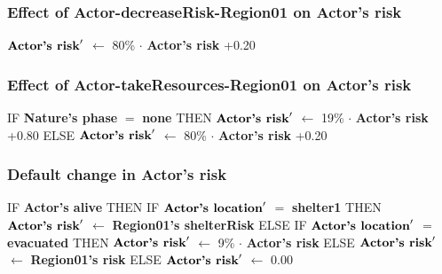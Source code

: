 \documentclass{article}%
\begin{document}
\subsubsection{Effect of Actor{-}decreaseRisk{-}Region01 on Actor's risk}%
\label{ssubsec:Effect of Actor{-}decreaseRisk{-}Region01 on Actor's risk}%
\begin{flushleft}%
$\mbox{\textbf{Actor's risk}} '$%
$\leftarrow$%
80\%%
$\cdot$%
\textbf{Actor's risk}%
+0.20%
\end{flushleft}

%
\subsubsection{Effect of Actor{-}takeResources{-}Region01 on Actor's risk}%
\label{ssubsec:Effect of Actor{-}takeResources{-}Region01 on Actor's risk}%
\begin{flushleft}%
IF %
\textbf{Nature's phase}%
$=$%
\textbf{none}%
\linebreak%
\hspace*{2em}%
THEN %
$\mbox{\textbf{Actor's risk}} '$%
$\leftarrow$%
19\%%
$\cdot$%
\textbf{Actor's risk}%
+0.80%
\linebreak%
\hspace*{2em}%
ELSE %
$\mbox{\textbf{Actor's risk}} '$%
$\leftarrow$%
80\%%
$\cdot$%
\textbf{Actor's risk}%
+0.20%
\end{flushleft}

%
\subsubsection{Default change in Actor's risk}%
\label{ssubsec:Default change in Actor's risk}%
\begin{flushleft}%
IF %
\textbf{Actor's alive}%
\linebreak%
\hspace*{2em}%
THEN %
IF %
$\mbox{\textbf{Actor's location}} '$%
$=$%
\textbf{shelter1}%
\linebreak%
\hspace*{4em}%
THEN %
$\mbox{\textbf{Actor's risk}} '$%
$\leftarrow$%
\textbf{Region01's shelterRisk}%
\linebreak%
\hspace*{4em}%
ELSE %
IF %
$\mbox{\textbf{Actor's location}} '$%
$=$%
\textbf{evacuated}%
\linebreak%
\hspace*{6em}%
THEN %
$\mbox{\textbf{Actor's risk}} '$%
$\leftarrow$%
9\%%
$\cdot$%
\textbf{Actor's risk}%
\linebreak%
\hspace*{6em}%
ELSE %
$\mbox{\textbf{Actor's risk}} '$%
$\leftarrow$%
\textbf{Region01's risk}%
\linebreak%
\hspace*{2em}%
ELSE %
$\mbox{\textbf{Actor's risk}} '$%
$\leftarrow$%
0.00%
\end{flushleft}
\end{document}

